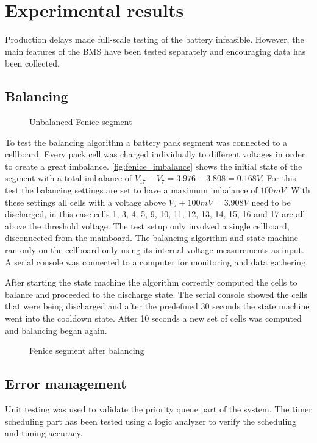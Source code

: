 \chapter{Experimental results}

Production delays made full-scale testing of the battery infeasible. However, the main features of the BMS have been tested separately and encouraging data has been collected.

\section{Balancing}
\begin{figure}[h]
	\centering
	
	\caption{Unbalanced Fenice segment}
	\label{fig:fenice_imbalance}
\end{figure}
To test the balancing algorithm a battery pack segment was connected to a cellboard. Every pack cell was charged individually to different voltages in order to create a great imbalance. \autoref{fig:fenice_imbalance} shows the initial state of the segment with a total imbalance of $V_{17} - V_{7} = 3.976 - 3.808 = 0.168 V$. For this test the balancing settings are set to have a maximum imbalance of $100 mV$. With these settings all cells with a voltage above $V_{7} + 100 mV = 3.908 V$ need to be discharged, in this case cells 1, 3, 4, 5, 9, 10, 11, 12, 13, 14, 15, 16 and 17 are all above the threshold voltage.
The test setup only involved a single cellboard, disconnected from the mainboard. The balancing algorithm and state machine ran only on the cellboard only using its internal voltage measurements as input. A serial console was connected to a computer for monitoring and data gathering.



After starting the state machine the algorithm correctly computed the cells to balance and proceeded to the discharge state. The serial console showed the cells that were being discharged and after the predefined 30 seconds the state machine went into the cooldown state. After 10 seconds a new set of cells was computed and balancing began again.
\begin{figure}[h]
	\centering
	
	\caption{Fenice segment after balancing}
	\label{fig:fenice_balanced}
\end{figure}

\section{Error management}
Unit testing was used to validate the priority queue part of the system. The timer scheduling part has been tested using a logic analyzer to verify the scheduling and timing accuracy.

